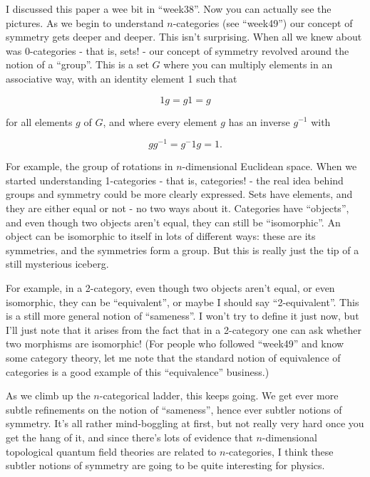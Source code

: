 \documentclass{article}
\def\tightlist{}
\renewcommand{\texttt}[1]{%
  \begingroup
  \ttfamily
  \begingroup\lccode`~=`/\lowercase{\endgroup\def~}{/\discretionary{}{}{}}%
  \begingroup\lccode`~=`[\lowercase{\endgroup\def~}{[\discretionary{}{}{}}%
  \begingroup\lccode`~=`.\lowercase{\endgroup\def~}{.\discretionary{}{}{}}%
  \catcode`/=\active\catcode`[=\active\catcode`.=\active
  \scantokens{#1\noexpand}%
  \endgroup
}
\begin{document}

I discussed this paper a wee bit in ``week38''. Now you can actually see
the pictures. As we begin to understand \(n\)-categories (see
``week49'') our concept of symmetry gets deeper and deeper. This isn't
surprising. When all we knew about was 0-categories - that is, sets! -
our concept of symmetry revolved around the notion of a ``group''. This
is a set \(G\) where you can multiply elements in an associative way,
with an identity element 1 such that

\[1g = g1 = g\]

for all elements \(g\) of \(G\), and where every element \(g\) has an
inverse \(g^{-1}\) with

\[gg^{-1} = g{^-1}g = 1.\]

For example, the group of rotations in \(n\)-dimensional Euclidean
space. When we started understanding 1-categories - that is, categories!
- the real idea behind groups and symmetry could be more clearly
expressed. Sets have elements, and they are either equal or not - no two
ways about it. Categories have ``objects'', and even though two objects
aren't equal, they can still be ``isomorphic''. An object can be
isomorphic to itself in lots of different ways: these are its
symmetries, and the symmetries form a group. But this is really just the
tip of a still mysterious iceberg.

For example, in a 2-category, even though two objects aren't equal, or
even isomorphic, they can be ``equivalent'', or maybe I should say
``2-equivalent''. This is a still more general notion of ``sameness''. I
won't try to define it just now, but I'll just note that it arises from
the fact that in a 2-category one can ask whether two morphisms are
isomorphic! (For people who followed ``week49'' and know some category
theory, let me note that the standard notion of equivalence of
categories is a good example of this ``equivalence'' business.)

As we climb up the \(n\)-categorical ladder, this keeps going. We get
ever more subtle refinements on the notion of ``sameness'', hence ever
subtler notions of symmetry. It's all rather mind-boggling at first, but
not really very hard once you get the hang of it, and since there's lots
of evidence that \(n\)-dimensional topological quantum field theories
are related to \(n\)-categories, I think these subtler notions of
symmetry are going to be quite interesting for physics.
\end{document}
